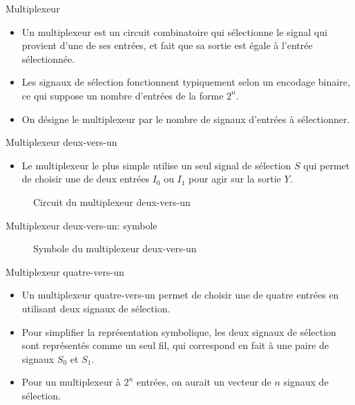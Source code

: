 \documentclass[presentation]{beamer}
\begin{document}
\begin{frame}[label={sec:org7515710}]{Multiplexeur}
\begin{itemize}
\item Un multiplexeur est un circuit combinatoire qui sélectionne le signal qui provient d'une de ses entrées, et fait que sa sortie est égale à l'entrée sélectionnée.

\item Les signaux de sélection fonctionnent typiquement selon un encodage binaire, ce qui suppose un nombre d'entrées de la forme \(2^n\).

\item On désigne le multiplexeur par le nombre de signaux d'entrées à sélectionner.
\end{itemize}
\end{frame}

\begin{frame}[label={sec:org22a95d4}]{Multiplexeur deux-vers-un}
\begin{itemize}
\item Le multiplexeur le plus simple utilise un seul signal de sélection \(S\) qui permet de choisir une de deux entrées \(I_0\) ou \(I_1\) pour agir sur la sortie \(Y\).
\end{itemize}

\begin{figure}[htbp]
\centering

\caption{\label{fig:org309811e}Circuit du multiplexeur deux-vers-un}
\end{figure}
\end{frame}

\begin{frame}[label={sec:org5f70e39}]{Multiplexeur deux-vers-un: symbole}
\begin{figure}[htbp]
\centering

\caption{\label{fig:org722666f}Symbole du multiplexeur deux-vers-un}
\end{figure}
\end{frame}

\begin{frame}[label={sec:org9cd4b15}]{Multiplexeur quatre-vers-un}
\begin{itemize}
\item Un multiplexeur quatre-vers-un permet de choisir une de quatre entrées en utilisant deux signaux de sélection.

\item Pour simplifier la représentation symbolique, les deux signaux de sélection sont représentés comme un seul fil, qui correspond en fait à une paire de signaux \(S_0\) et \(S_1\).

\item Pour un multiplexeur à \(2^n\) entrées, on aurait un vecteur de \(n\) signaux de sélection.
\end{itemize}
\end{frame}
\end{document}
